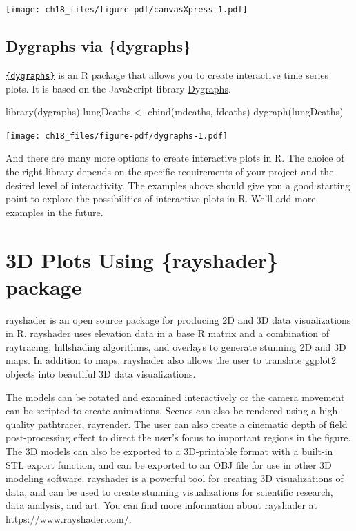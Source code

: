\documentclass[
  letterpaper,
  DIV=11,
  numbers=noendperiod]{scrreprt}
\newenvironment{Shaded}{\begin{snugshade}}{\end{snugshade}}
\newcommand{\FunctionTok}[1]{\textcolor[rgb]{0.28,0.35,0.67}{#1}}
\newcommand{\NormalTok}[1]{\textcolor[rgb]{0.00,0.23,0.31}{#1}}
\newcommand{\OtherTok}[1]{\textcolor[rgb]{0.00,0.23,0.31}{#1}}
\begin{document}
\texttt{[image: ch18\_files/figure-pdf/canvasXpress-1.pdf]}

\section{Dygraphs via \{dygraphs\}}\label{dygraphs-via-dygraphs}

\href{https://rstudio.github.io/dygraphs/}{\texttt{\{dygraphs\}}} is an
R package that allows you to create interactive time series plots. It is
based on the JavaScript library \href{https://dygraphs.com/}{Dygraphs}.

\begin{Shaded}
\begin{Highlighting}[]
\FunctionTok{library}\NormalTok{(dygraphs)}
\NormalTok{lungDeaths }\OtherTok{\textless{}{-}} \FunctionTok{cbind}\NormalTok{(mdeaths, fdeaths)}
\FunctionTok{dygraph}\NormalTok{(lungDeaths)}
\end{Highlighting}
\end{Shaded}

\texttt{[image: ch18\_files/figure-pdf/dygraphs-1.pdf]}

And there are many more options to create interactive plots in R. The
choice of the right library depends on the specific requirements of your
project and the desired level of interactivity. The examples above
should give you a good starting point to explore the possibilities of
interactive plots in R. We'll add more examples in the future.


\chapter{3D Plots Using \{rayshader\}
package}\label{d-plots-using-rayshader-package}

rayshader is an open source package for producing 2D and 3D data
visualizations in R. rayshader uses elevation data in a base R matrix
and a combination of raytracing, hillshading algorithms, and overlays to
generate stunning 2D and 3D maps. In addition to maps, rayshader also
allows the user to translate ggplot2 objects into beautiful 3D data
visualizations.

The models can be rotated and examined interactively or the camera
movement can be scripted to create animations. Scenes can also be
rendered using a high-quality pathtracer, rayrender. The user can also
create a cinematic depth of field post-processing effect to direct the
user's focus to important regions in the figure. The 3D models can also
be exported to a 3D-printable format with a built-in STL export
function, and can be exported to an OBJ file for use in other 3D
modeling software. rayshader is a powerful tool for creating 3D
visualizations of data, and can be used to create stunning
visualizations for scientific research, data analysis, and art. You can
find more information about rayshader at https://www.rayshader.com/.
\end{document}
